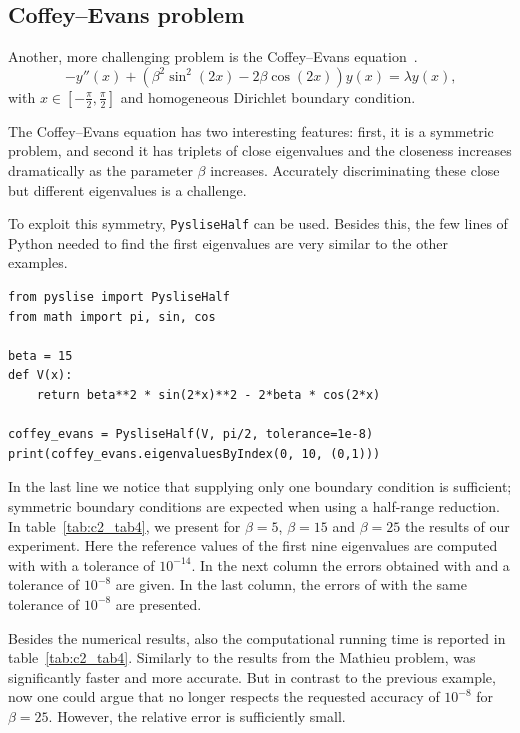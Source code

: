 \subsection{Coffey--Evans problem}\label{sec:c2_numerical_experiments_coffey_evans}

Another, more challenging problem is the Coffey--Evans equation~\cite{pryce_error_1986}.
\begin{equation}
  -y''(x) + (\beta^2\sin^2(2x)-2\beta\cos(2x))y(x) = \lambda y(x)\text{,}\label{equ:c2_coffey_evans}
\end{equation}
with $x \in [-\frac{\pi}{2}, \frac{\pi}{2}]$ and homogeneous Dirichlet boundary condition.

The Coffey--Evans equation has two interesting features: first, it is a symmetric problem, and second it has triplets of close eigenvalues and the closeness increases dramatically as the parameter $\beta$ increases. Accurately discriminating these close but different eigenvalues is a challenge.

To exploit this symmetry, \texttt{PysliseHalf} can be used. Besides this, the few lines of Python needed to find the first eigenvalues are very similar to the other examples.

\begin{verbatim}
from pyslise import PysliseHalf
from math import pi, sin, cos

beta = 15
def V(x):
    return beta**2 * sin(2*x)**2 - 2*beta * cos(2*x)

coffey_evans = PysliseHalf(V, pi/2, tolerance=1e-8)
print(coffey_evans.eigenvaluesByIndex(0, 10, (0,1)))
\end{verbatim}

In the last line we notice that supplying only one boundary condition is sufficient; symmetric boundary conditions are expected when using a half-range reduction. In table~\ref{tab:c2_tab4}, we present for $\beta=5$, $\beta=15$ and $\beta=25$ the results of our experiment. Here the reference values of the first nine eigenvalues are computed with  with a tolerance of $10^{-14}$. In the next column the errors obtained with  and a tolerance of $10^{-8}$ are given. In the last column, the errors of \pyslise{} with the same tolerance of $10^{-8}$ are presented.

Besides the numerical results, also the computational running time is reported in table~\ref{tab:c2_tab4}. Similarly to the results from the Mathieu problem, \pyslise{} was significantly faster and more accurate. But in contrast to the previous example, now one could argue that  no longer respects the requested accuracy of $10^{-8}$ for $\beta = 25$. However, the relative error is sufficiently small.

